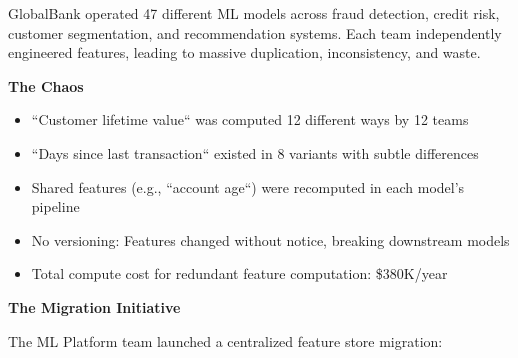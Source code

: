 GlobalBank operated 47 different ML models across fraud detection, credit risk, customer segmentation, and recommendation systems. Each team independently engineered features, leading to massive duplication, inconsistency, and waste.

\textbf{The Chaos}

\begin{itemize}
    \item ``Customer lifetime value`` was computed 12 different ways by 12 teams
    \item ``Days since last transaction`` existed in 8 variants with subtle differences
    \item Shared features (e.g., ``account age``) were recomputed in each model's pipeline
    \item No versioning: Features changed without notice, breaking downstream models
    \item Total compute cost for redundant feature computation: \$380K/year
\end{itemize}

\textbf{The Migration Initiative}

The ML Platform team launched a centralized feature store migration:


